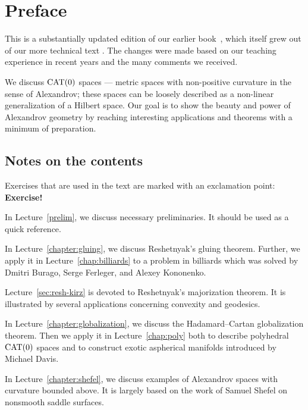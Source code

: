 \chapter*{Preface}
\thispagestyle{myheadings}

This is a substantially updated edition of our earlier book~\cite{alexander-kapovitch-petrunin-2019}, which itself grew out of our more technical text \cite{alexander-kapovitch-petrunin-2025}.
The changes were made based on our teaching experience in recent years and the many comments we received.

We discuss $\mathrm{CAT}(0)$ spaces --- metric spaces with non-positive curvature in the sense of Alexandrov; these spaces can be loosely described as a non-linear generalization of a Hilbert space.
Our goal is to show the beauty and power of Alexandrov geometry by reaching interesting applications and theorems with a minimum of preparation.


\section*{Notes on the contents}

Exercises that are used in the text are marked with an exclamation point: \textbf{Exercise!}



\medskip

In Lecture~\ref{prelim}, we discuss necessary preliminaries.
It should be used as a quick reference.

In Lecture~\ref{chapter:gluing}, we discuss Reshetnyak's gluing theorem.
Further, we apply it in Lecture~\ref{chap:billiards} to a problem in billiards which was solved by Dmitri Burago, Serge Ferleger, and Alexey Kononenko.

Lecture~\ref{sec:resh-kirz} is devoted to Reshetnyak's majorization theorem.
It is illustrated by several applications concerning convexity and geodesics.

In Lecture~\ref{chapter:globalization}, we discuss the Hadamard--Cartan globalization theorem.
Then we apply it in Lecture~\ref{chap:poly} both to describe polyhedral $\mathrm{CAT}(0)$ spaces and to construct exotic aspherical manifolds introduced by Michael Davis.

In Lecture~\ref{chapter:shefel}, we discuss examples of Alexandrov spaces with curvature bounded above.
It is largely based on the work of Samuel Shefel on nonsmooth saddle surfaces.

